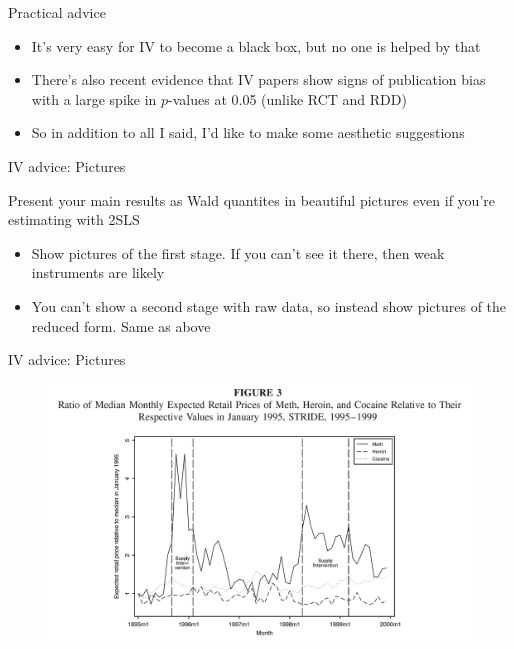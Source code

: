 \documentclass{beamer}
\begin{document}
\begin{frame}{Practical advice}

\begin{itemize}
\item It's very easy for IV to become a black box, but no one is helped by that
\item There's also recent evidence that IV papers show signs of publication bias with a large spike in $p$-values at 0.05 (unlike RCT and RDD)
\item So in addition to all I said, I'd like to make some aesthetic suggestions

\end{itemize}

\end{frame}



\begin{frame}{IV advice: Pictures}

Present your main results as Wald quantites in beautiful pictures even if you're estimating with 2SLS
	\begin{itemize}
	\item Show pictures of the first stage. If you can't see it there, then weak instruments are likely
	\item You can't show a second stage with raw data, so instead show pictures of the reduced form. Same as above
	\end{itemize}

\end{frame}



\begin{frame}{IV advice: Pictures}
	
	\begin{figure}
	\includegraphics[scale=0.15]{./lecture_includes/keith_1.png}
	\end{figure}
	
\end{frame}
\end{document}
